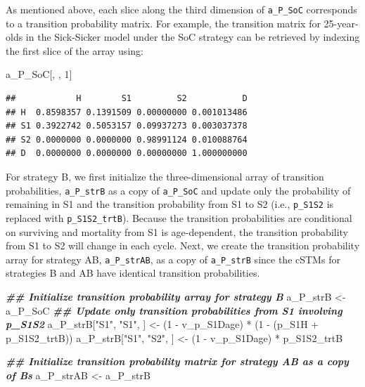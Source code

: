 \documentclass[
]{article}
\newenvironment{Shaded}{\begin{snugshade}}{\end{snugshade}}
\newcommand{\DecValTok}[1]{\textcolor[rgb]{0.00,0.00,0.81}{#1}}
\newcommand{\DocumentationTok}[1]{\textcolor[rgb]{0.56,0.35,0.01}{\textbf{\textit{#1}}}}
\newcommand{\NormalTok}[1]{#1}
\newcommand{\OtherTok}[1]{\textcolor[rgb]{0.56,0.35,0.01}{#1}}
\newcommand{\SpecialCharTok}[1]{\textcolor[rgb]{0.00,0.00,0.00}{#1}}
\newcommand{\StringTok}[1]{\textcolor[rgb]{0.31,0.60,0.02}{#1}}
\begin{document}
As mentioned above, each slice along the third dimension of \texttt{a\_P\_SoC} corresponds to a transition probability matrix. For example, the transition matrix for 25-year-olds in the Sick-Sicker model under the SoC strategy can be retrieved by indexing the first slice of the array using:

\begin{Shaded}
\begin{Highlighting}[]
\NormalTok{a\_P\_SoC[, , }\DecValTok{1}\NormalTok{]}
\end{Highlighting}
\end{Shaded}

\begin{verbatim}
##            H        S1         S2           D
## H  0.8598357 0.1391509 0.00000000 0.001013486
## S1 0.3922742 0.5053157 0.09937273 0.003037378
## S2 0.0000000 0.0000000 0.98991124 0.010088764
## D  0.0000000 0.0000000 0.00000000 1.000000000
\end{verbatim}

For strategy B, we first initialize the three-dimensional array of transition probabilities, \texttt{a\_P\_strB} as a copy of \texttt{a\_P\_SoC} and update only the probability of remaining in S1 and the transition probability from S1 to S2 (i.e., \texttt{p\_S1S2} is replaced with \texttt{p\_S1S2\_trtB}). Because the transition probabilities are conditional on surviving and mortality from S1 is age-dependent, the transition probability from S1 to S2 will change in each cycle. Next, we create the transition probability array for strategy AB, \texttt{a\_P\_strAB}, as a copy of \texttt{a\_P\_strB} since the cSTMs for strategies B and AB have identical transition probabilities.

\begin{Shaded}
\begin{Highlighting}[]
\DocumentationTok{\#\# Initialize transition probability array for strategy B}
\NormalTok{a\_P\_strB }\OtherTok{\textless{}{-}}\NormalTok{ a\_P\_SoC}
\DocumentationTok{\#\# Update only transition probabilities from S1 involving p\_S1S2}
\NormalTok{a\_P\_strB[}\StringTok{"S1"}\NormalTok{, }\StringTok{"S1"}\NormalTok{, ] }\OtherTok{\textless{}{-}}\NormalTok{ (}\DecValTok{1} \SpecialCharTok{{-}}\NormalTok{ v\_p\_S1Dage) }\SpecialCharTok{*}\NormalTok{ (}\DecValTok{1} \SpecialCharTok{{-}}\NormalTok{ (p\_S1H }\SpecialCharTok{+}\NormalTok{ p\_S1S2\_trtB))}
\NormalTok{a\_P\_strB[}\StringTok{"S1"}\NormalTok{, }\StringTok{"S2"}\NormalTok{, ] }\OtherTok{\textless{}{-}}\NormalTok{ (}\DecValTok{1} \SpecialCharTok{{-}}\NormalTok{ v\_p\_S1Dage) }\SpecialCharTok{*}\NormalTok{ p\_S1S2\_trtB}

\DocumentationTok{\#\# Initialize transition probability matrix for strategy AB as a copy of B\textquotesingle{}s}
\NormalTok{a\_P\_strAB }\OtherTok{\textless{}{-}}\NormalTok{ a\_P\_strB}
\end{Highlighting}
\end{Shaded}
\end{document}
